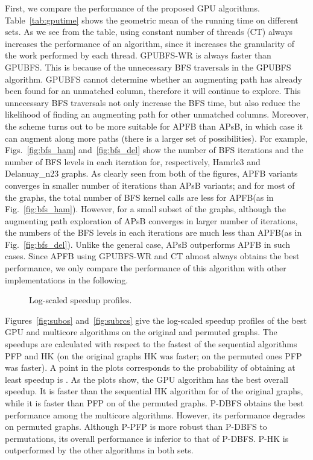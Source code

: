 \documentclass[11pt,a4paper]{article}
\newcommand{\GPUone}{GPUBFS\xspace}
\newcommand{\GPUtwo}{GPUBFS-WR\xspace}
\newcommand{\mcpf}{P-PFP\xspace}
\newcommand{\mchk}{P-HK\xspace}
\newcommand{\mcbfs}{P-DBFS\xspace}
\newcommand{\APSBFS}{APsB\xspace}
\newcommand{\APFBFS}{APFB\xspace}
\newcommand{\altswap}{{\sc{Alternate}}\xspace}
\begin{document}
First, we compare the performance of the proposed GPU algorithms. Table~\ref{tab:gputime} 
shows the geometric mean of the running time on different sets. As we see from the table, 
using constant number of threads (CT) always increases the performance of an algorithm, since it
increases the granularity of the work performed by each thread. \GPUtwo{} is always
faster than \GPUone{}. This is because of the unnecessary BFS traversals in the \GPUone{}
algorithm. \GPUone{} cannot determine whether an augmenting path has already 
been found for an unmatched column, therefore it will continue to explore.
This unnecessary BFS traversals not only increase the BFS time, but also reduce the likelihood of
finding an augmenting path for other unmatched columns. 
Moreover, the \altswap scheme turns out to be more suitable for \APFBFS than \APSBFS, 
in which case it can augment along more paths (there is a larger 
set of possibilities). For example, Figs.~\ref{fig:bfs_ham} and~\ref{fig:bfs_del} show the number 
of BFS iterations and the number of BFS levels in each iteration for, respectively, Hamrle3 and Delanuay\_n23 graphs. 
As clearly seen from both of the figures, 
\APFBFS variants converges in smaller number of iterations than \APSBFS variants; and for most of the graphs,
the total number of BFS kernel calls are less for \APFBFS (as in Fig.~\ref{fig:bfs_ham}). 
However, for a small subset of the graphs, although the augmenting path exploration
of \APSBFS converges in larger number of iterations, the numbers of the BFS levels in each iterations
are much less than \APFBFS (as in Fig.~\ref{fig:bfs_del}). Unlike the general case,
\APSBFS outperforms \APFBFS in such cases.
Since \APFBFS using \GPUtwo{}   
and CT 
almost always obtains the best performance, we only compare the performance of this 
algorithm with other implementations in the following.

\begin{figure} [!htb]
\vspace*{-1em}
\caption{Log-scaled speedup profiles.}
\end{figure}




Figures~\ref{fig:subos} and~\ref{fig:subrcs} give the log-scaled 
speedup profiles of the best GPU and multicore algorithms on 
the original and permuted graphs. The speedups are calculated with respect to the fastest of
the sequential algorithms PFP and HK (on the original graphs HK was faster; on the permuted ones PFP was faster). 
A point  in the plots corresponds to the 
probability of obtaining at least  speedup is . As the plots show, the GPU 
algorithm has the best overall speedup. It is faster than the sequential HK 
algorithm for  of the original graphs, while it is faster than PFP on 
of the permuted graphs. \mcbfs obtains the best performance among the multicore algorithms.
However, its performance degrades on permuted graphs.
Although \mcpf is more robust than \mcbfs to permutations, its overall performance
is inferior to that of \mcbfs. \mchk is outperformed by the other algorithms in both sets. 
\end{document}
